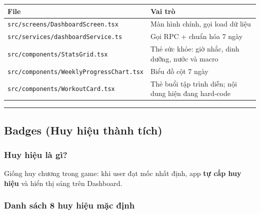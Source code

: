 \documentclass[12pt,a4paper]{article}
\newcounter{none}
\providecommand{\passthrough}[1]{#1}
\begin{document}
{\def\LTcaptype{none} %
\begin{longtable}[]{@{}
  >{\raggedright\arraybackslash}p{}
  >{\raggedright\arraybackslash}p{}@{}}
\toprule\noalign{}
\begin{minipage}[b]{\linewidth}\raggedright
File
\end{minipage} & \begin{minipage}[b]{\linewidth}\raggedright
Vai trò
\end{minipage} \\
\midrule\noalign{}
\endhead
\bottomrule\noalign{}
\endlastfoot
\passthrough{\lstinline!src/screens/DashboardScreen.tsx!} & Màn hình
chính, gọi load dữ liệu \\
\passthrough{\lstinline!src/services/dashboardService.ts!} & Gọi RPC +
chuẩn hóa 7 ngày \\
\passthrough{\lstinline!src/components/StatsGrid.tsx!} & Thẻ sức khỏe:
giờ nhắc, dinh dưỡng, nước và macro \\
\passthrough{\lstinline!src/components/WeeklyProgressChart.tsx!} & Biểu
đồ cột 7 ngày \\
\passthrough{\lstinline!src/components/WorkoutCard.tsx!} & Thẻ buổi tập
trình diễn; nội dung hiện đang hard-code \\
\end{longtable}
}

\begin{center}\rule{0.5\linewidth}{0.5pt}\end{center}

\subsection{Badges (Huy hiệu thành
tích)}\label{badges-huy-hiux1ec7u-thuxe0nh-tuxedch}

\subsubsection{Huy hiệu là gì?}\label{huy-hiux1ec7u-luxe0-guxec}

Giống huy chương trong game: khi user đạt mốc nhất định, app \textbf{tự
cấp huy hiệu} và hiển thị sáng trên Dashboard.

\subsubsection{Danh sách 8 huy hiệu mặc
định}\label{danh-suxe1ch-8-huy-hiux1ec7u-mux1eb7c-ux111ux1ecbnh}
\end{document}
